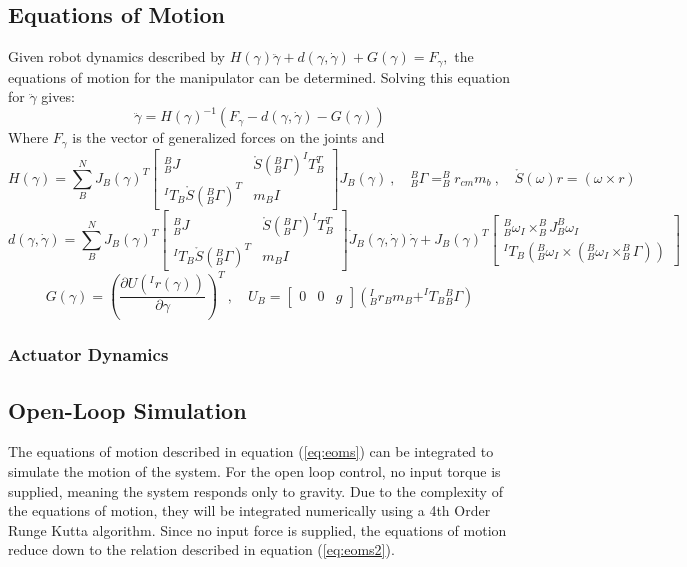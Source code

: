 \subsection{Equations of Motion}
Given robot dynamics described by \(H(\gamma) \ddot{\gamma}+d(\gamma, \dot{\gamma})+G(\gamma)=F_{\gamma},\) the equations of motion for
the manipulator can be determined. Solving this equation for \(\ddot{\gamma}\) gives:
\begin{equation}
  \ddot{\gamma}=H(\gamma)^{-1}\left(F_{\gamma}-d(\gamma, \dot{\gamma})-G(\gamma)\right)
  \label{eq:eoms}
\end{equation}
Where $F_{\gamma}$ is the vector of generalized forces on the joints and
\[
  \renewcommand{\arraystretch}{1.5}
  H(\gamma) = \sum_B^N J_B(\gamma)^T
  \begin{bmatrix}
    ^B_BJ & \mathring{S}(^B_B\Gamma) ^IT_B^T\\
    ^IT_B\mathring{S}(^B_B\Gamma)^T & m_BI
  \end{bmatrix}
  J_B(\gamma)~,\quad
  ^B_B\Gamma = ^B_Br_{cm}m_b~,\quad \mathring{S}(\omega)r=(\omega\times r)
\]
\[
  \renewcommand{\arraystretch}{1.5}
  d(\gamma,\dot{\gamma}) = \sum_B^N J_B(\gamma)^T
  \begin{bmatrix}
    ^B_BJ & \mathring{S}(^B_B\Gamma) ^IT_B^T\\
    ^IT_B\mathring{S}(^B_B\Gamma)^T & m_BI
  \end{bmatrix}
  \dot{J}_B(\gamma,\dot{\gamma})\dot{\gamma}+J_B(\gamma)^T
  \begin{bmatrix}
    ^B_B\omega_I \times ^B_BJ ^B_B\omega_I \\
    ^IT_B\left(^B_B\omega_I\times(^B_B\omega_I\times^B_B\Gamma)\right)
  \end{bmatrix}
\]
\[
G(\gamma) = \left(\frac{\partial U(^Ir(\gamma))}{\partial\gamma}\right)^T~,\quad U_B = \begin{bmatrix} 0 & 0 & g\end{bmatrix}\left(^I_Br_Bm_B + ^IT_B{}_B^B\Gamma\right)
\]
\subsubsection{Actuator Dynamics}

\subsection{Open-Loop Simulation}
The equations of motion described in equation (\ref{eq:eoms}) can be integrated to simulate the motion of the system. For the open loop control, no input torque is supplied, meaning the system responds only to gravity. Due to the complexity of the equations of motion, they will be integrated numerically using a 4th Order Runge Kutta algorithm. Since no input force is supplied, the equations of motion reduce down to the relation described in equation (\ref{eq:eoms2}).

